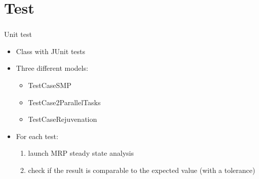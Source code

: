 \section{Test}
\begin{frame}
  \frametitle{\insertsection}
  \begin{block}{Unit test}
    \begin{itemize}
    \item Class  with \alert{JUnit} tests
      \pause
    \item Three different \alert{models}:
      \pause
      \begin{itemize}
      \item TestCaseSMP
        \pause
      \item TestCase2ParallelTasks
        \pause
      \item TestCaseRejuvenation
        \pause
      \end{itemize}
    \item For each test:
      \pause
      \begin{enumerate}
      \item launch \acs{MRP} steady state \alert{analysis}
        \pause
      \item check if the result is comparable to the \alert{expected}
        value \pause (with a tolerance)
      \end{enumerate}
    \end{itemize}
  \end{block}
\end{frame}

